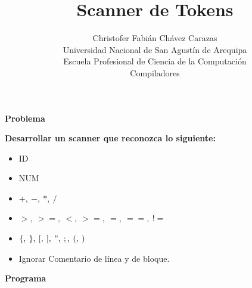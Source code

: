 \documentclass[a4paper,12pt]{article}
\begin{document}
\title{Scanner de Tokens}
\author{
Christofer Fabián Chávez Carazas \\
\small{Universidad Nacional de San Agustín de Arequipa} \\
\small{Escuela Profesional de Ciencia de la Computación} \\
\small{Compiladores}
}
\date{}

\maketitle

\begin{large}
 \textbf{Problema}
\end{large}

\textbf{Desarrollar un scanner que reconozca lo siguiente:}

\begin{itemize}
 \item ID
 \item NUM
 \item $+,\:-,\:*,\:/$
 \item $>,\:>=,\:<,\:>=,\:=,\:==,\:!=$
 \item $\{,\:\},\:[,\:],\:",\:;,\:(,\:)$
 \item Ignorar Comentario de línea y de bloque.
\end{itemize}

\begin{large}
 \textbf{Programa}
\end{large}
\end{document}
